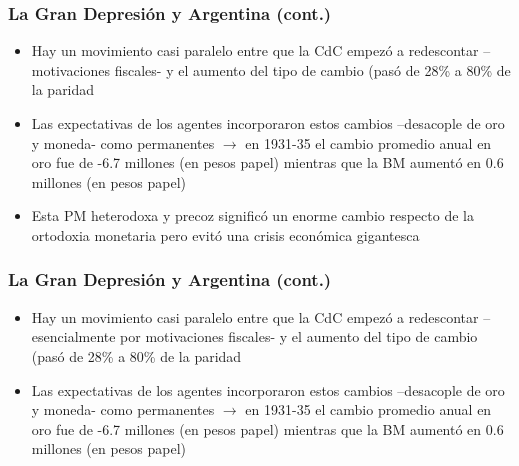 \documentclass[14pt,aspectratio=169]{beamer}
\begin{document}
\begin{frame}\frametitle{La Gran Depresión y Argentina (cont.)}
          \begin{itemize} \itemsep 15pt
          \item Hay un movimiento casi paralelo entre que la CdC
            empezó a redescontar --motivaciones
            fiscales- y el aumento del tipo de cambio (pasó de 28\% a
            80\% de la paridad
            \item Las expectativas de los agentes incorporaron estos
              cambios --desacople de oro y moneda- como permanentes
              $\longrightarrow$ en 1931-35 el cambio promedio anual en
              oro fue de -6.7 millones (en pesos papel) mientras que la BM aumentó en
              0.6 millones (en pesos papel)
              \item Esta PM heterodoxa y precoz significó un enorme
                cambio respecto de la ortodoxia monetaria pero evitó
                una crisis económica gigantesca
                         \end{itemize}
      \end{frame}
  

\begin{frame}\frametitle{La Gran Depresión y Argentina (cont.)}
          \begin{itemize} \itemsep 15pt
          \item Hay un movimiento casi paralelo entre que la CdC
            empezó a redescontar --esencialmente por motivaciones
            fiscales- y el aumento del tipo de cambio (pasó de 28\% a
            80\% de la paridad
            \item Las expectativas de los agentes incorporaron estos
              cambios --desacople de oro y moneda- como permanentes
              $\longrightarrow$ en 1931-35 el cambio promedio anual en
              oro fue de -6.7 millones (en pesos papel) mientras que la BM aumentó en
              0.6 millones (en pesos papel)
              
                         \end{itemize}
      \end{frame}
  
      
\end{document}
